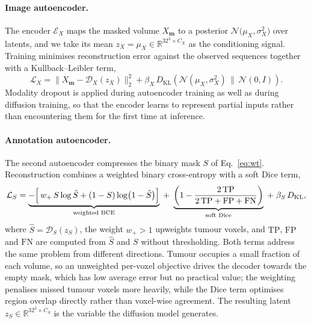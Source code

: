 \paragraph{Image autoencoder.}
The encoder $\mathcal{E}_{X}$ maps the masked volume $X_{\mathbf{m}}$ to a
posterior $\mathcal{N}\bigl(\mu_{X}, \sigma_{X}^{2}\bigr)$ over latents, and we
take its mean $z_{X} = \mu_{X} \in \mathbb{R}^{32^{3} \times C_{X}}$ as the
conditioning signal. Training minimises reconstruction error against the
observed sequences together with a Kullback--Leibler term,
\begin{equation}
    \mathcal{L}_{X}
    = \bigl\| X_{\mathbf{m}} - \mathcal{D}_{X}(z_{X}) \bigr\|_{2}^{2}
    + \beta_{X}\, D_{\mathrm{KL}}\!\left(
        \mathcal{N}(\mu_{X}, \sigma_{X}^{2}) \,\|\, \mathcal{N}(0, I)
      \right).
\end{equation}
Modality dropout is applied during autoencoder training as well as during
diffusion training, so that the encoder learns to represent partial inputs
rather than encountering them for the first time at inference.

\paragraph{Annotation autoencoder.}
The second autoencoder compresses the binary mask $S$ of Eq.~\eqref{eq:wt}.
Reconstruction combines a weighted binary cross-entropy with a soft Dice
term,
\begin{equation}
    \mathcal{L}_{S}
    = \underbrace{-\Bigl[\, w_{+}\, S \log \hat{S}
        + (1 - S) \log \bigl(1 - \hat{S}\bigr) \Bigr]}_{\text{weighted BCE}}
    \;+\; \underbrace{\left( 1 - \frac{2\,\mathrm{TP}}
        {2\,\mathrm{TP} + \mathrm{FP} + \mathrm{FN}} \right)}_{\text{soft Dice}}
    \;+\; \beta_{S}\, D_{\mathrm{KL}},
    \label{eq:mask-loss}
\end{equation}
where $\hat{S} = \mathcal{D}_{S}(z_{S})$, the weight $w_{+} > 1$ upweights
tumour voxels, and $\mathrm{TP}$, $\mathrm{FP}$ and $\mathrm{FN}$ are computed
from $\hat{S}$ and $S$ without thresholding. Both terms address the same
problem from different directions. Tumour occupies a small fraction of each
volume, so an unweighted per-voxel objective drives the decoder towards the
empty mask, which has low average error but no practical value; the weighting
penalises missed tumour voxels more heavily, while the Dice term optimises
region overlap directly rather than voxel-wise agreement. The resulting latent
$z_{S} \in \mathbb{R}^{32^{3} \times C_{S}}$ is the variable the diffusion
model generates.

